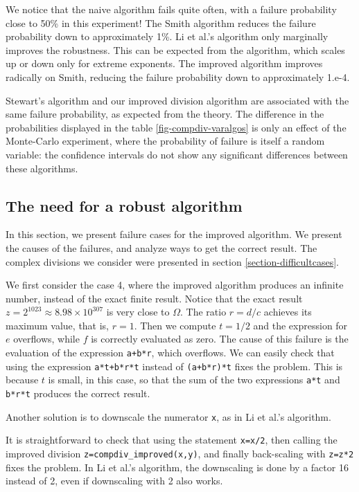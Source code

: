 \documentclass{paper}
\newcommand{\scivar}[1]{\texttt{#1}}
\begin{document}
We notice that the naive algorithm fails quite often, with a failure probability close 
to 50\% in this experiment! 
The Smith algorithm reduces the failure probability down 
to approximately 1\%. 
Li et al.'s algorithm only marginally improves the robustness. 
This can be expected from the algorithm, which scales up or down 
only for extreme exponents. 
The improved algorithm improves radically on Smith, reducing the 
failure probability down to approximately 1.e-4. 

Stewart's algorithm and our improved division algorithm are 
associated with the same failure probability, as expected from 
the theory. 
The difference in the probabilities displayed in the 
table \ref{fig-compdiv-varalgos} is only an effect 
of the Monte-Carlo experiment, where the probability of failure is 
itself a random variable: the confidence intervals 
do not show any significant differences between these algorithms.

\subsection{The need for a robust algorithm}
\label{section-needforrobust}

In this section, we present failure cases for the improved algorithm. 
We present the causes of the failures, and analyze ways to get the 
correct result. 
The complex divisions we consider were presented in section \ref{section-difficultcases}. 

We first consider the case 4, where the improved algorithm produces an 
infinite number, instead of the exact finite result. 
Notice that the exact result $z = 2^{1023}\approx 8.98\times 10^{307}$ is very close to $\Omega$.
The ratio $r=d/c$ achieves its maximum value, that is, $r=1$. 
Then we compute $t=1/2$ and the expression for $e$ overflows, while 
$f$ is correctly evaluated as zero. 
The cause of this failure is the evaluation of the 
expression \scivar{a+b*r}, which overflows.
We can easily check that using the expression 
\scivar{a*t+b*r*t} instead of \scivar{(a+b*r)*t} fixes the problem. 
This is because $t$ is small, in this case, so that the sum of the 
two expressions \scivar{a*t} and \scivar{b*r*t} produces the correct 
result.

Another solution is to downscale the numerator \scivar{x}, 
as in Li et al.'s algorithm. 

It is straightforward to check that using the statement \scivar{x=x/2}, 
then calling the improved division \scivar{z=compdiv\_improved(x,y)}, 
and finally back-scaling with \scivar{z=z*2} fixes the problem.
In Li et al.'s algorithm, the downscaling is done by a factor 16 instead 
of 2, even if downscaling with 2 also works.
\end{document}
